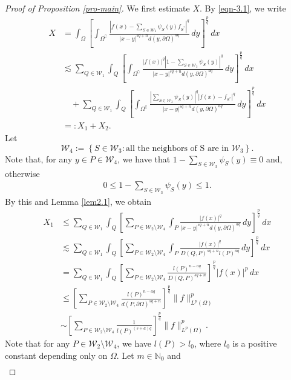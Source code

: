\documentclass[11pt,twoside]{article}
\def\cw{\mathcal W}
\def\boz{{\Omega}}
\def\pa{\partial}                %
\theoremstyle{mylem}
\theoremstyle{definition}
\numberwithin{equation}{section}
\begin{document}
\begin{proof}[Proof of Proposition \ref{pro-main}]
We first estimate $X$.
By \eqref{eqn-3.1}, we write
\begin{align}\label{eqn-5.3}
X&= \int_{\boz} \left[ \int_{{\boz}^\complement} \frac{| f(x) - \sum_{S\in\mathcal{W}_3} \psi_S(y) f_{S^{*}}|^q}{|x - y|^{s q + n}d(y,\pa\boz)^{aq}}\,dy \right]^{\frac{p}{q}}\,dx  \nonumber \\
&\lesssim \sum_{Q\in\mathcal{W}_1}  \int_{Q} \left[ \int_{{\boz}^\complement} \frac{| f(x) |^q |1- \sum_{S\in\mathcal{W}_3} \psi_S(y) |^q}{|x - y|^{s q + n}d(y,\pa\boz)^{aq}}\,dy \right]^{\frac{p}{q}}\,dx \nonumber\\
&\quad+ \sum_{Q\in\cw_1} \int_{Q} \left[ \int_{{\boz}^\complement} \frac{| \sum_{S\in\mathcal{W}_3} \psi_S(y)|^q |f(x)- f_{S^{*}}|^q}{|x - y|^{s q + n}d(y,\pa\boz)^{aq}}\,dy \right]^{\frac{p}{q}}\,dx \nonumber \\
&=:X_1+X_2.
\end{align}
Let 
$$
\cw_4:=\left\{S\in\cw_3:\text {all the neighbors of S are in } \cw_3 \right\}.
$$
Note that, for any $y\in P\in\cw_4$, we have that $1-\sum_{S\in\mathcal{W}_3}\psi_{S}(y) \equiv 0$  and, otherwise 
\begin{align}\label{1719}
0\leq 1-\sum_{S\in\mathcal{W}_3}\psi_{S}(y)\leq 1.
\end{align}
By this and Lemma \ref{lem2.1}, we obtain
\begin{align}\label{eqn-6.6}
X_1&\leq\sum_{Q\in\mathcal{W}_1}  \int_{Q} \left[ \sum_{P\in\cw_2\setminus\cw_4} \int_{P}\frac{| f(x) |^q}{|x - y|^{s q + n}d(y,\pa\boz)^{aq}}\,dy \right]^{\frac{p}{q}}\,dx \nonumber\\
&\lesssim \sum_{Q\in\mathcal{W}_1}  \int_{Q} \left[\sum_{P\in\cw_2\setminus\cw_4} \int_{P} \frac{| f(x) |^q}{D(Q,P)^{s q + n}l(P)^{aq}}\,dy \right]^{\frac{p}{q}}\,dx \nonumber\\
&=\sum_{Q\in\mathcal{W}_1}  \int_{Q} \left[\sum_{P\in\cw_2\setminus\cw_4} \frac{l(P)^{n-aq}}{D(Q,P)^{s q + n}} \right]^{\frac{p}{q}}|f(x)|^p\,dx \nonumber\\
&\leq \left[\sum_{P\in\cw_2\setminus\cw_4} \frac{l(P)^{n-aq}}{d(P,\pa\boz)^{s q + n}} \right]^{\frac{p}{q}}\|f\|_{L^{p}(\boz)}^p\nonumber\\
&\sim \left[\sum_{P\in\cw_2\setminus\cw_4} \frac{1}{l(P)^{(s+a)q}} \right]^{\frac{p}{q}}\|f\|_{L^{p}(\boz)}^p.
\end{align}
Note that for any $P\in\cw_2\setminus\cw_4$, we have $l(P)>l_0$,
where $l_0$ is a positive constant depending only on $\boz$. Let \(m\in\mathbb N_0\) and
\begin{align*}

\end{align*}
\end{proof}
\end{document}
